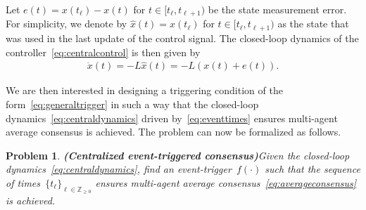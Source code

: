\documentclass{autart}
\newtheorem{problem}[theorem]{Problem}
\newcommand{\integernonnegative}{\mathbb{Z}_{\ge 0}}
\renewcommand{\hat}{\widehat}
\newcommand{\longthmtitle}[1]{\mbox{}\textup{\textbf{(#1)}}}
\newcommand{\margin}[1]{\marginpar{\color{red}\tiny\ttfamily#1}}
\begin{document}
Let $e(t) = x(t_\ell) - x(t)$ for $t \in [t_\ell, t_{\ell+1})$ be the
state measurement error.  For simplicity, we denote by
$\hat{x}(t) = x(t_\ell)$ for $t \in [t_\ell, t_{\ell+1})$ as the state
that was used in the last update of the control signal.  The
closed-loop dynamics of the controller~\eqref{eq:centralcontrol} is
then given by
\begin{align}\label{eq:centraldynamics}
  \dot{x}(t) = -L \hat{x}(t) = -L( x(t) + e(t) ).
\end{align}


{We are then interested in designing a triggering condition of the
form~\eqref{eq:generaltrigger} in such a way that the closed-loop
dynamics~\eqref{eq:centraldynamics} driven by~\eqref{eq:eventtimes}
ensures multi-agent average consensus is achieved. The problem can now
be formalized as follows.}

\begin{problem}\longthmtitle{Centralized event-triggered {consensus}}\label{pr:central}
  Given the closed-loop dynamics~\eqref{eq:centraldynamics}, find an
  event-trigger~$f(\cdot)$ such that the sequence of times~$\{ t_\ell
  \}_{\ell \in \integernonnegative}$ ensures multi-agent average
  consensus~\eqref{eq:averageconsensus} is achieved.
\end{problem}
\end{document}
